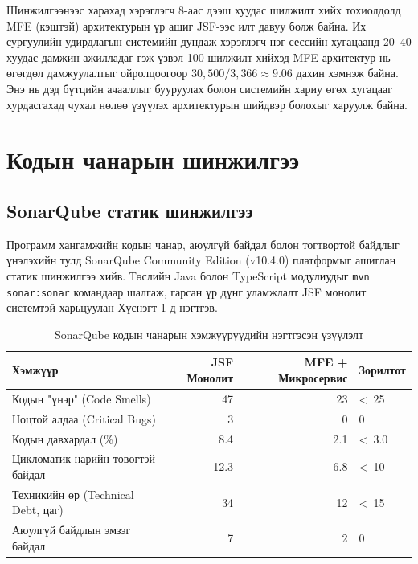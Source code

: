 Шинжилгээнээс харахад хэрэглэгч 8-аас дээш хуудас шилжилт хийх тохиолдолд MFE (кэштэй) архитектурын үр ашиг JSF-ээс илт давуу болж байна. Их сургуулийн удирдлагын системийн дундаж хэрэглэгч нэг сессийн хугацаанд 20--40 хуудас дамжин ажилладаг гэж үзвэл 100 шилжилт хийхэд MFE архитектур нь өгөгдөл дамжуулалтыг ойролцоогоор $30,500/3,366 \approx 9.06$ дахин хэмнэж байна. Энэ нь дэд бүтцийн ачааллыг бууруулах болон системийн хариу өгөх хугацааг хурдасгахад чухал нөлөө үзүүлэх архитектурын шийдвэр болохыг харуулж байна.

\section{Кодын чанарын шинжилгээ}

\subsection{SonarQube статик шинжилгээ}

Программ хангамжийн кодын чанар, аюулгүй байдал болон тогтвортой байдлыг үнэлэхийн тулд SonarQube Community Edition (v10.4.0) платформыг ашиглан статик шинжилгээ хийв. Төслийн Java болон TypeScript модулиудыг \texttt{mvn sonar:sonar} командаар шалгаж, гарсан үр дүнг уламжлалт JSF монолит системтэй харьцуулан Хүснэгт \ref{tab:sonarqube}-д нэгтгэв.

\begin{table}[H]
    \centering
    \caption{SonarQube кодын чанарын хэмжүүрүүдийн нэгтгэсэн үзүүлэлт}
    \label{tab:sonarqube}
    \renewcommand{\arraystretch}{0.7}
    \begin{tabular}{lrrl}
        \toprule
        \textbf{Хэмжүүр} & \textbf{JSF Монолит} & \textbf{MFE + Микросервис} & \textbf{Зорилтот} \\
        \midrule
        Кодын "үнэр" (Code Smells)   & 47    & 23    & \textless~25 \\
        Ноцтой алдаа (Critical Bugs) & 3     & 0     & 0 \\
        Кодын давхардал (\%)         & 8.4   & 2.1   & \textless~3.0 \\
        Цикломатик нарийн төвөгтэй байдал & 12.3  & 6.8   & \textless~10 \\
        Техникийн өр (Technical Debt, цаг) & 34    & 12    & \textless~15 \\
        Аюулгүй байдлын эмзэг байдал & 7     & 2     & 0 \\
        \bottomrule
    \end{tabular}
\end{table}


